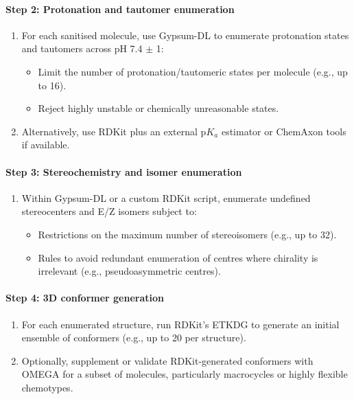 \documentclass[12pt]{article}
\begin{document}
\paragraph{Step 2: Protonation and tautomer enumeration}

\begin{enumerate}
  \item For each sanitised molecule, use Gypsum-DL to enumerate protonation states and tautomers across pH 7.4 \(\pm\) 1:
  \begin{itemize}
    \item Limit the number of protonation/tautomeric states per molecule (e.g., up to 16).
    \item Reject highly unstable or chemically unreasonable states.
  \end{itemize}
  \item Alternatively, use RDKit plus an external p$K_a$ estimator or ChemAxon tools if available.
\end{enumerate}

\paragraph{Step 3: Stereochemistry and isomer enumeration}

\begin{enumerate}
  \item Within Gypsum-DL or a custom RDKit script, enumerate undefined stereocenters and E/Z isomers subject to:
  \begin{itemize}
    \item Restrictions on the maximum number of stereoisomers (e.g., up to 32).
    \item Rules to avoid redundant enumeration of centres where chirality is irrelevant (e.g., pseudoasymmetric centres).
  \end{itemize}
\end{enumerate}

\paragraph{Step 4: 3D conformer generation}

\begin{enumerate}
  \item For each enumerated structure, run RDKit's ETKDG to generate an initial ensemble of conformers (e.g., up to 20 per structure).
  \item Optionally, supplement or validate RDKit-generated conformers with OMEGA for a subset of molecules, particularly macrocycles or highly flexible chemotypes.
\end{enumerate}
\end{document}
